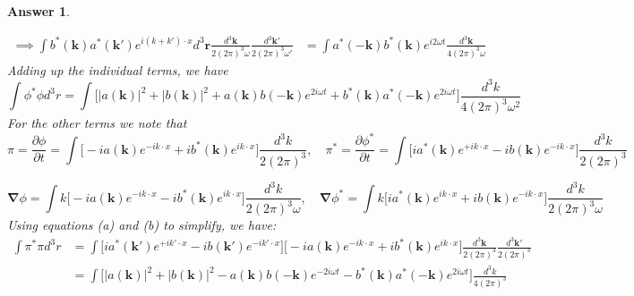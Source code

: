 \documentclass[a4paper]{article}
\newtheorem{ans}{Answer}[section]
\theoremstyle{new}
\begin{document}
\begin{ans}
\begin{enumerate}[label=(\alph*)]
\begin{align}
    \implies\int b^*(\mathbf{k})a^*(\mathbf{k'})e^{i(k+k')\cdot x}d^3\mathbf{r}\frac{d^3\mathbf{k}}{2(2\pi)^3\omega}\frac{d^3\mathbf{k'}}{2(2\pi)^3\omega'}&=\int a^*(-\mathbf{k})b^*(\mathbf{k})e^{i2\omega t}\frac{d^3\mathbf{k}}{4(2\pi)^3\omega}\nonumber
\end{align}
Adding up the individual terms, we have
$$\int\phi^*\phi d^3r=\int\bigg[|a(\mathbf{k})|^2+|b(\mathbf{k})|^2+a(\mathbf{k})b(-\mathbf{k})e^{2i\omega t}+b^*(\mathbf{k})a^*(-\mathbf{k})e^{2i\omega t}\bigg]\frac{d^3k}{4(2\pi)^3\omega^2}$$
For the other terms we note that
$$\pi=\frac{\partial\phi}{\partial t}=\int\bigg[-ia(\mathbf{k})e^{-ik\cdot x}+ib^*(\mathbf{k})e^{ik\cdot x}\bigg]\frac{d^3k}{2(2\pi)^3},\quad \pi^*=\frac{\partial\phi^*}{\partial t}=\int\bigg[ia^*(\mathbf{k})e^{+ik\cdot x}-ib(\mathbf{k})e^{-ik\cdot x}\bigg]\frac{d^3k}{2(2\pi)^3}$$

$$\boldsymbol{\nabla}\phi=\int k\bigg[-ia(\mathbf{k})e^{-ik\cdot x}-ib^*(\mathbf{k})e^{ik\cdot x}\bigg]\frac{d^3k}{2(2\pi)^3\omega},\quad \boldsymbol{\nabla}\phi^*=\int k\bigg[ia^*(\mathbf{k})e^{ik\cdot x}+ib(\mathbf{k})e^{-ik\cdot x}\bigg]\frac{d^3k}{2(2\pi)^3\omega}$$
Using equations (a) and (b) to simplify, we have:
\begin{align}
\int\pi^*\pi d^3r&=\int \bigg[ia^*(\mathbf{k'})e^{+ik'\cdot x}-ib(\mathbf{k'})e^{-ik'\cdot x}\bigg]\bigg[-ia(\mathbf{k})e^{-ik\cdot x}+ib^*(\mathbf{k})e^{ik\cdot x}\bigg]\frac{d^3\mathbf{k}}{2(2\pi)^3}\frac{d^3\mathbf{k'}}{2(2\pi)^3}\nonumber\\&=\int\bigg[|a(\mathbf{k})|^2+|b(\mathbf{k})|^2-a(\mathbf{k})b(-\mathbf{k})e^{-2i\omega t}-b^*(\mathbf{k})a^*(-\mathbf{k})e^{2i\omega t}\bigg]\frac{d^3k}{4(2\pi)^3}\nonumber
\end{align}


\end{enumerate}
\end{ans}
\end{document}
